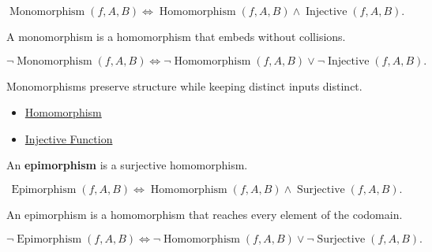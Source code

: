 \begin{remark*}
\[
\operatorname{Monomorphism}(f,A,B)
\Longleftrightarrow
\operatorname{Homomorphism}(f,A,B)
\land
\operatorname{Injective}(f,A,B).
\]
\end{remark*}

\begin{remark*}
A monomorphism is a homomorphism that embeds without collisions.
\end{remark*}

\begin{remark*}
\[
\neg\operatorname{Monomorphism}(f,A,B)
\Longleftrightarrow
\neg\operatorname{Homomorphism}(f,A,B)
\lor
\neg\operatorname{Injective}(f,A,B).
\]
\end{remark*}

\begin{remark*}[Interpretation]
Monomorphisms preserve structure while keeping distinct inputs distinct.
\end{remark*}

\begin{dependencies}
\begin{itemize}
  \item \hyperref[def:algebraic-homomorphism]{Homomorphism}
  \item \hyperref[def:alg-injective]{Injective Function}
\end{itemize}
\end{dependencies}

\begin{definition}[Epimorphism]
\label{def:epimorphism}
An \textbf{epimorphism} is a surjective homomorphism.
\end{definition}

\begin{remark*}
\[
\operatorname{Epimorphism}(f,A,B)
\Longleftrightarrow
\operatorname{Homomorphism}(f,A,B)
\land
\operatorname{Surjective}(f,A,B).
\]
\end{remark*}

\begin{remark*}
An epimorphism is a homomorphism that reaches every element of the codomain.
\end{remark*}

\begin{remark*}
\[
\neg\operatorname{Epimorphism}(f,A,B)
\Longleftrightarrow
\neg\operatorname{Homomorphism}(f,A,B)
\lor
\neg\operatorname{Surjective}(f,A,B).
\]
\end{remark*}

